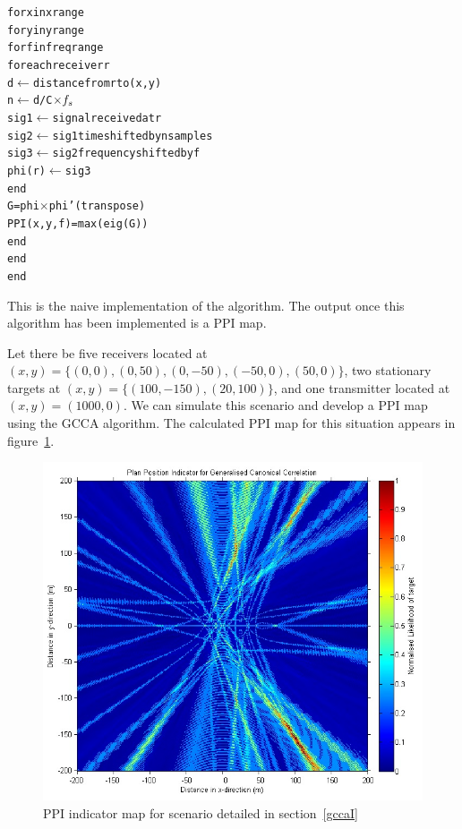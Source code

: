 \documentclass[12pt,openany,a4paper]{book}
\begin{document}
\begin{alltt}
for x in xrange
    for y in yrange
        for f in freqrange
            for each receiver r
                d \(\gets\) distance from r to (x,y)
                n \(\gets\) d/C \(\times f\sb{s}\)
                sig1 \(\gets\) signal received at r
                sig2 \(\gets\) sig1 time shifted by n samples
                sig3 \(\gets\) sig2 frequency shifted by f                
                phi(r) \(\gets\) sig3
            end
            G = phi \(\times\) phi' (transpose)
            PPI(x,y,f) = max(eig(G))
        end
    end
end
\end{alltt}

This is the naive implementation of the algorithm. The output once this algorithm has been implemented is a PPI map.

\bigskip

Let there be five receivers located at $(x,y) = \{(0,0), (0,50), (0,-50), (-50,0), (50,0)\}$, two stationary targets at $(x,y) = \{(100,-150), (20, 100)\}$, and one transmitter located at $(x,y) = (1000,0)$. We can simulate this scenario and develop a PPI map using the GCCA algorithm.  The calculated PPI map for this situation appears in figure~\ref{ppi1}.

\begin{figure}[htbp]
\centerline{\includegraphics{ppi1.jpg}}
\caption{PPI indicator map for scenario detailed in section~\ref{gccaI}}
\label{ppi1}
\end{figure}
\end{document}
